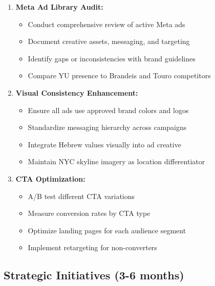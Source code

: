\documentclass[12pt,letterpaper]{article}
\begin{document}
\begin{enumerate}[leftmargin=*]
    \item \textbf{Meta Ad Library Audit:}
    \begin{itemize}
        \item Conduct comprehensive review of active Meta ads
        \item Document creative assets, messaging, and targeting
        \item Identify gaps or inconsistencies with brand guidelines
        \item Compare YU presence to Brandeis and Touro competitors
    \end{itemize}

    \item \textbf{Visual Consistency Enhancement:}
    \begin{itemize}
        \item Ensure all ads use approved brand colors and logos
        \item Standardize messaging hierarchy across campaigns
        \item Integrate Hebrew values visually into ad creative
        \item Maintain NYC skyline imagery as location differentiator
    \end{itemize}

    \item \textbf{CTA Optimization:}
    \begin{itemize}
        \item A/B test different CTA variations
        \item Measure conversion rates by CTA type
        \item Optimize landing pages for each audience segment
        \item Implement retargeting for non-converters
    \end{itemize}
\end{enumerate}

\subsection{Strategic Initiatives (3-6 months)}
\end{document}
